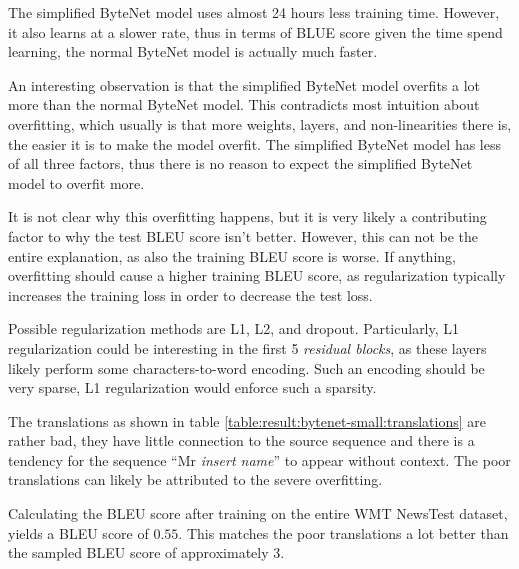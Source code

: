 The simplified ByteNet model uses almost 24 hours less training time. However, it also learns at a slower rate, thus in terms of BLUE score given the time spend learning, the normal ByteNet model is actually much faster.

An interesting observation is that the simplified ByteNet model overfits a lot more than the normal ByteNet model. This contradicts most intuition about overfitting, which usually is that more weights, layers, and non-linearities there is, the easier it is to make the model overfit. The simplified ByteNet model has less of all three factors, thus there is no reason to expect the simplified ByteNet model to overfit more.

It is not clear why this overfitting happens, but it is very likely a contributing factor to why the test BLEU score isn't better. However, this can not be the entire explanation, as also the training BLEU score is worse. If anything, overfitting should cause a higher training BLEU score, as regularization typically increases the training loss in order to decrease the test loss.

Possible regularization methods are L1, L2, and dropout. Particularly, L1 regularization could be interesting in the first 5 \textit{residual blocks}, as these layers likely perform some characters-to-word encoding. Such an encoding should be very sparse, L1 regularization would enforce such a sparsity.

The translations as shown in table \ref{table:result:bytenet-small:translations} are rather bad, they have little connection to the source sequence and there is a tendency for the sequence ``Mr \textit{insert name}'' to appear without context. The poor translations can likely be attributed to the severe overfitting.

Calculating the BLEU score after training on the entire WMT NewsTest dataset, yields a BLEU score of $0.55$. This matches the poor translations a lot better than the sampled BLEU score of approximately $3$.

